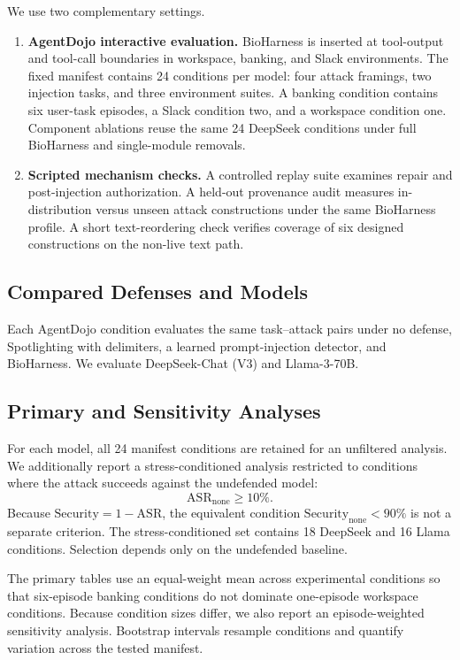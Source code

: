 We use two complementary settings.
\begin{enumerate}
    \item \textbf{AgentDojo interactive evaluation.} BioHarness is inserted at tool-output and tool-call boundaries in workspace, banking, and Slack environments. The fixed manifest contains 24 conditions per model: four attack framings, two injection tasks, and three environment suites. A banking condition contains six user-task episodes, a Slack condition two, and a workspace condition one. Component ablations reuse the same 24 DeepSeek conditions under full BioHarness and single-module removals.
    \item \textbf{Scripted mechanism checks.} A controlled replay suite examines repair and post-injection authorization. A held-out provenance audit measures in-distribution versus unseen attack constructions under the same BioHarness profile. A short text-reordering check verifies coverage of six designed constructions on the non-live text path.
\end{enumerate}

\subsection{Compared Defenses and Models}

Each AgentDojo condition evaluates the same task--attack pairs under no defense, Spotlighting with delimiters, a learned prompt-injection detector, and BioHarness. We evaluate DeepSeek-Chat (V3) and Llama-3-70B.

\subsection{Primary and Sensitivity Analyses}
\label{sec:stress-gate}

For each model, all 24 manifest conditions are retained for an unfiltered analysis. We additionally report a stress-conditioned analysis restricted to conditions where the attack succeeds against the undefended model:
\begin{equation}
    \mathrm{ASR}_{\mathrm{none}}\geq 10\%.
\end{equation}
Because $\mathrm{Security}=1-\mathrm{ASR}$, the equivalent condition $\mathrm{Security}_{\mathrm{none}}<90\%$ is not a separate criterion. The stress-conditioned set contains 18 DeepSeek and 16 Llama conditions. Selection depends only on the undefended baseline.

The primary tables use an equal-weight mean across experimental conditions so that six-episode banking conditions do not dominate one-episode workspace conditions. Because condition sizes differ, we also report an episode-weighted sensitivity analysis. Bootstrap intervals resample conditions and quantify variation across the tested manifest.

